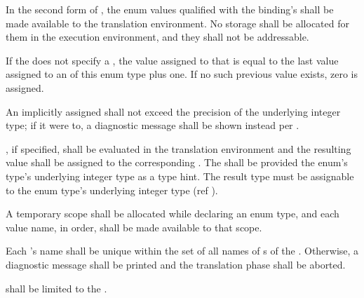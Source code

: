 \specsubsubitem
In the second form of , the enum values qualified
with the binding's  shall be made available to the
translation environment. No storage shall be allocated for them in the
execution environment, and they shall not be addressable.

\specsubsubitem
If the  does not specify a ,
the value assigned to that  is equal to the last value
assigned to an  of this enum type plus one. If no such
previous value exists, zero is assigned.

\specsubsubitem
An implicitly assigned  shall not exceed the precision
of the underlying integer type; if it were to, a diagnostic message shall be
shown instead per .

\specsubsubitem
{}, if specified, shall be evaluated in the translation
environment and the resulting value shall be assigned to the corresponding
. The  shall be provided the
enum's type's underlying integer type as a type hint. The result type must be
assignable to the enum type's underlying integer type (ref
).

\specsubsubitem
A temporary scope shall be allocated while declaring an enum type, and each value
name, in order, shall be made available to that scope.


\specsubsubitem
Each 's name shall be unique within the set of all
names of s of the . Otherwise, a
diagnostic message shall be printed and the translation phase shall be aborted.

\specsubsubitem
{} shall be limited to the
.


